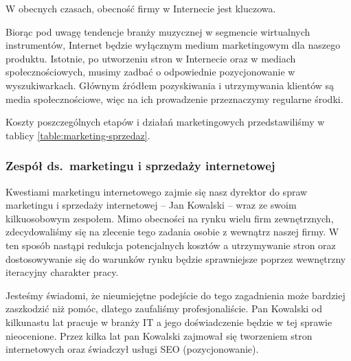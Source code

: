 \documentclass[12pt]{article}
\begin{document}

W obecnych czasach, obecność firmy w Internecie jest kluczowa.

Biorąc pod uwagę tendencje branży muzycznej w segmencie wirtualnych instrumentów, Internet będzie wyłącznym medium marketingowym dla naszego produktu.
Istotnie, po utworzeniu stron w Internecie oraz w mediach społecznościowych, musimy zadbać o odpowiednie pozycjonowanie w wyszukiwarkach.
Głównym źródłem pozyskiwania i utrzymywania klientów są media społecznościowe, więc na ich prowadzenie przeznaczymy regularne środki.

Koszty poszczególnych etapów i działań marketingowych przedstawiliśmy w tablicy \ref{table:marketing-sprzedaz}.


\subsubsection{Zespół ds.\ marketingu i sprzedaży internetowej}

Kwestiami marketingu internetowego zajmie się nasz dyrektor do spraw marketingu i sprzedaży internetowej -- Jan Kowalski -- wraz ze swoim kilkuosobowym zespołem.
Mimo obecności na rynku wielu firm zewnętrznych, zdecydowaliśmy się na zlecenie tego zadania osobie z wewnątrz naszej firmy.
W ten sposób nastąpi redukcja potencjalnych kosztów a utrzymywanie stron oraz dostosowywanie się do warunków rynku będzie sprawniejsze poprzez wewnętrzny iteracyjny charakter pracy.

Jesteśmy świadomi, że nieumiejętne podejście do tego zagadnienia może bardziej zaszkodzić niż pomóc, dlatego zaufaliśmy profesjonaliście.
Pan Kowalski od kilkunastu lat pracuje w branży IT a jego doświadczenie będzie w tej sprawie nieocenione.
Przez kilka lat pan Kowalski zajmował się tworzeniem stron internetowych oraz świadczył usługi SEO (pozycjonowanie).

\end{document}
